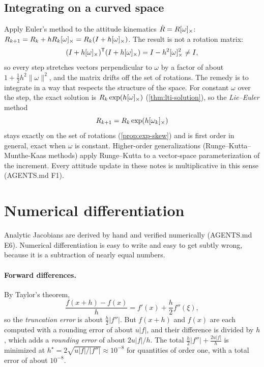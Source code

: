 \subsection{Integrating on a curved space}
\label{sec:lie-euler}

Apply Euler's method to the attitude kinematics $\dot R = R[\omega]_{\times}$: $R_{k+1} = R_k + hR_k[\omega]_{\times} = R_k(I + h[\omega]_{\times})$. The result
is not a rotation matrix:
\begin{equation}
  (I + h[\omega]_{\times})^{\mathsf{T}}(I + h[\omega]_{\times}) = I - h^2[\omega]_{\times}^2 \neq I,
\end{equation}
so every step stretches vectors perpendicular to $\omega$ by a factor of about $1 + \tfrac12h^2\|\omega\|^2$, and the matrix drifts off the set of
rotations. The remedy is to integrate in a way that respects the structure of the space. For constant $\omega$ over the step, the exact
solution is $R_k\exp(h[\omega]_{\times})$ (\cref{thm:lti-solution}), so the \emph{Lie--Euler} method
\begin{equation}
  R_{k+1} = R_k\exp(h[\omega_k]_{\times})
\end{equation}
stays exactly on the set of rotations (\cref{prop:exp-skew}) and is first order in general, exact when $\omega$ is constant. Higher-order
generalizations (Runge--Kutta--Munthe-Kaas methods) apply Runge--Kutta to a vector-space parameterization of the increment. Every attitude
update in these notes is multiplicative in this sense (AGENTS.md F1).

\section{Numerical differentiation}
\label{sec:numdiff}

Analytic Jacobians are derived by hand and verified numerically (AGENTS.md E6). Numerical differentiation is easy to write and easy to
get subtly wrong, because it is a subtraction of nearly equal numbers.

\paragraph{Forward differences.} By Taylor's theorem,
\begin{equation}
  \frac{f(x + h) - f(x)}{h} = f'(x) + \frac h2f''(\xi),
\end{equation}
so the \emph{truncation error} is about $\frac h2|f''|$. But $f(x + h)$ and $f(x)$ are each computed with a rounding error of about $u|f|$, and
their difference is divided by $h$, which adds a \emph{rounding error} of about $2u|f|/h$. The total $\frac h2|f''| + \frac{2u|f|}{h}$ is minimized at
$h^\star = 2\sqrt{u|f|/|f''|} \approx 10^{-8}$ for quantities of order one, with a total error of about $10^{-8}$.

